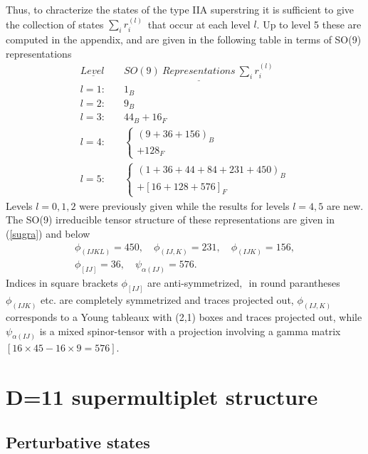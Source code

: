 Thus, to chracterize the states of the type IIA superstring it is sufficient
to give the collection of states $\sum_ir_i^{(l)}\,$ that occur at each
level $l$. Up to level 5 these are computed in the appendix, and are given
in the following table in terms of SO(9) representations
\begin{equation}
\begin{array}{ll}
\underline{Level\ } & \underline{SO(9)\ Representations\ \sum_ir_i^{(l)}} \\
l=1:\quad & 1_B \\
l=2: & 9_B \\
l=3: & 44_B+16_F \\
l=4: & \left\{
\begin{array}{l}
(9+36+156)_B \\
+128_F
\end{array}
\right. \\
l=5: & \left\{
\begin{array}{l}
\left( 1+36+44+84+231+450\right) _B \\
+\left[ 16+128+576\right] _F
\end{array}
\right.
\end{array}
\label{perturbative}
\end{equation}
Levels $l=0,1,2$ were previously given \cite{GSW} while the results for
levels $l=4,5$ are new. The SO(9) irreducible tensor structure of these
representations are given in (\ref{sugra}) and below
\begin{equation}
\begin{array}{l}
\phi _{(IJKL)}=450,\quad \phi _{(IJ,K)}=231,\quad \phi _{(IJK)}=156, \\
\phi _{[IJ]}=36,\quad {{{\psi _{\alpha (IJ)}=576.}}}
\end{array}
\end{equation}
Indices in square brackets $\phi _{[IJ]}$ are anti-symmetrized$,\,$ in round
parantheses $\phi _{(IJK)}$ etc. are completely symmetrized and traces
projected out, $\phi _{(IJ,K)}$ corresponds to a Young tableaux with (2,1)
boxes and traces projected out, while ${{{\psi _{\alpha (IJ)}}}}$ is a mixed
spinor-tensor with a projection involving a gamma matrix $[16\times
45-16\times 9=576].$

\section{D=11 supermultiplet structure}

\subsection{Perturbative states}

